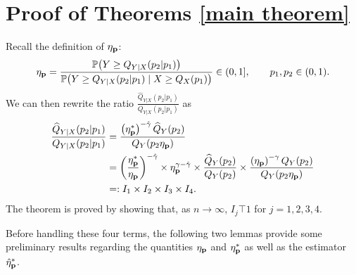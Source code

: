 \appendix
\def\thesection{Appendix \Alph{section}}
\def\thetheorem{\Alph{section}.\arabic{theorem}}
\setcounter{equation}{0}
\renewcommand{\theequation}{A.\arabic{equation}}

\setcounter{page}{1}


\section{Proof of Theorems \ref{main theorem}}
\label{appen_proofA}
Recall the definition of $\eta_{\mathbf p}$:
$$\eta_{\mathbf p} = \dfrac{{\mathbb P}\bigl(Y\ge Q_{Y|X}(p_2|p_1)\bigr)}{{\mathbb P}\bigl(Y\ge Q_{Y|X}(p_2|p_1)\mid X\ge Q_X(p_1)\bigr)}\in(0,1],\qquad p_1,p_2\in(0,1).$$
We can then rewrite the ratio $\frac{\widehat{Q}_{Y|X}(p_2|p_1)}{Q_{Y|X}(p_2|p_1)}$ as 
\begin{align*}
    \frac{\widehat{Q}_{Y|X}(p_2|p_1)}{Q_{Y|X}(p_2|p_1)} &=\frac{\left(\eta_{\mathbf p}^*\right)^{-\hat\gamma}\widehat{Q}_Y(p_2)}{Q_Y(p_2\eta_{\mathbf p})}\\
    &=\left(\frac{\eta_{\mathbf p}^*}{\eta_{\mathbf p}}\right)^{-\hat\gamma}\times \eta_{\mathbf p}^{\gamma-\hat\gamma
    } \times \frac{\widehat{Q}_Y(p_2)}{Q_Y(p_2)} \times\frac{\left(\eta_{\mathbf p}\right)^{-\gamma}Q_Y(p_2)}{Q_Y(p_2\eta_{\mathbf p})} \\
    &=:I_1\times I_2\times I_3\times I_4.
\end{align*}
The theorem is proved by showing that, as $n\to\infty$, $I_j\top1$ for $j=1,2,3,4$. 

Before handling these four terms, the following two lemmas provide some preliminary results regarding the quantities $\eta_{\mathbf p}$ and $\eta^*_{\mathbf p}$ as well as the estimator $\hat{\eta}^*_{\mathbf p}$.

